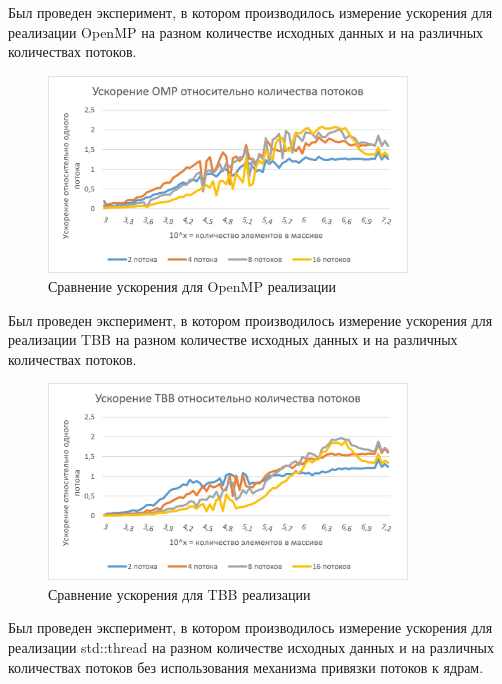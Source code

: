 \documentclass{report}
\begin{document}
\par Был проведен эксперимент, в котором производилось измерение ускорения для реализации OpenMP на разном количестве исходных данных и на различных количествах потоков.
\begin{figure}[H]
    \centering
    \includegraphics[width=0.85\textwidth]{../../modules/task_1/ivanov_arkady_rbms/images/boost_omp.jpg}
    \caption{Сравнение ускорения для OpenMP реализации}
    \label{fig:my_label_3}
\end{figure}
\par Был проведен эксперимент, в котором производилось измерение ускорения для реализации TBB на разном количестве исходных данных и на различных количествах потоков.
\begin{figure}[H]
    \centering
    \includegraphics[width=0.85\textwidth]{../../modules/task_1/ivanov_arkady_rbms/images/boost_tbb.jpg}
    \caption{Сравнение ускорения для TBB реализации}
    \label{fig:my_label_4}
\end{figure}
\par Был проведен эксперимент, в котором производилось измерение ускорения для реализации std::thread на разном количестве исходных данных и на различных количествах потоков без использования механизма привязки потоков к ядрам.
\end{document}
